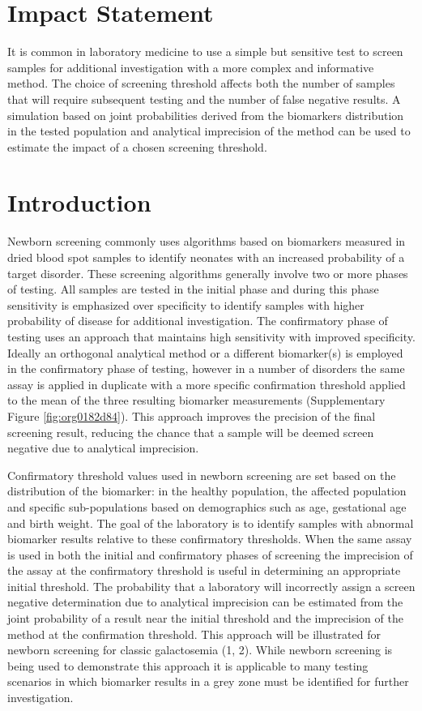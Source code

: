 \documentclass[review]{elsarticle}
\makeatletter
\newcommand{\citeprocitem}[2]{\hyper@linkstart{cite}{citeproc_bib_item_#1}#2\hyper@linkend}
\makeatother
\begin{document}
\section*{Impact Statement}
\label{sec:org7970489}
It is common in laboratory medicine to use a simple but sensitive
test to screen samples for additional investigation with a more
complex and informative method. The choice of screening threshold
affects both the number of samples that will require subsequent
testing and the number of false negative results. A simulation based
on joint probabilities derived from the biomarkers distribution in
the tested population and analytical imprecision of the method can
be used to estimate the impact of a chosen screening threshold.

\section*{Introduction}
\label{sec:orge9f992c}
Newborn screening commonly uses algorithms based on biomarkers
measured in dried blood spot samples to identify neonates with an
increased probability of a target disorder. These screening algorithms
generally involve two or more phases of testing. All samples are
tested in the initial phase and during this phase sensitivity is
emphasized over specificity to identify samples with higher
probability of disease for additional investigation. The confirmatory
phase of testing uses an approach that maintains high sensitivity
with improved specificity. Ideally an orthogonal analytical method or
a different biomarker(s) is employed in the confirmatory phase of
testing, however in a number of disorders the same assay is applied in
duplicate with a more specific confirmation threshold applied to the
mean of the three resulting biomarker measurements (Supplementary Figure
\ref{fig:org0182d84}). This approach improves the precision of the final
screening result, reducing the chance that a sample will be deemed
screen negative due to analytical imprecision.

Confirmatory threshold values used in newborn screening are set based
on the distribution of the biomarker: in the healthy population, the
affected population and specific sub-populations based on demographics
such as age, gestational age and birth weight. The goal of the
laboratory is to identify samples with abnormal biomarker results
relative to these confirmatory thresholds. When the same assay is used
in both the initial and confirmatory phases of screening the
imprecision of the assay at the confirmatory threshold is useful in
determining an appropriate initial threshold. The probability that a
laboratory will incorrectly assign a screen negative determination due
to analytical imprecision can be estimated from the joint probability
of a result near the initial threshold and the imprecision of the
method at the confirmation threshold. This approach will be
illustrated for newborn screening for classic galactosemia
(\citeprocitem{1}{1}, \citeprocitem{2}{2}). While newborn screening is being
used to demonstrate this approach it is applicable to many testing
scenarios in which biomarker results in a grey zone must be identified
for further investigation.
\end{document}
